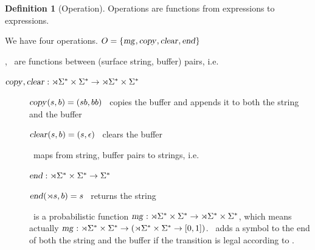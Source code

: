 \documentclass[12pt]{article}
\theoremstyle{definition}
\newtheorem{definition}{Definition}[section]
\begin{document}
\begin{definition}[Operation]
  Operations are functions from expressions to expressions.

  We have four operations. $O=\{\text{\textsl{mg}},\text{\textsl{copy}},\text{\textsl{clear}},\text{\textsl{end}}\}$ 

  \cp, \cl~are  functions between (surface string, buffer) pairs, i.e.

  $\text{\textsl{copy}},\text{\textsl{clear}} : \rtimes\Sigma^* \times \Sigma^* \rightarrow  \rtimes\Sigma^* \times \Sigma^*$

  \begin{description}
  \item[\cp] $\text{\textsl{copy}}(s,b) = (sb,bb)$ \hfill \cp~copies the buffer and appends it to both the string and the buffer

 \item[\cl] $\text{\textsl{clear}}(s,b) = (s,\epsilon)$ \hfill \cl~clears the buffer


  \end{description}



  \begin{description}
  \item[\ed]   \ed~maps from string, buffer pairs to strings, i.e.

  $\text{\textsl{end}} : \rtimes\Sigma^* \times \Sigma^* \rightarrow  \Sigma^*$

  $\text{\textsl{end}}(\rtimes s,b) = s$ \hfill \ed~returns the string

  
  \end{description}





   \begin{description}

   \item[\mg] \mg~is a probabilistic function $\text{\textsl{mg}}:\rtimes\Sigma^*\times\Sigma^*\rightarrow \rtimes\Sigma^*\times\Sigma^*$, which means actually $\text{\textsl{mg}}:\rtimes\Sigma^*\times\Sigma^* \rightarrow (\rtimes\Sigma^*\times\Sigma^* \rightarrow [0,1])$.
     \mg~adds a symbol to the end of both the string and the buffer if the transition is legal according to \BIGR.
     

\end{description}
\end{definition}
\end{document}
